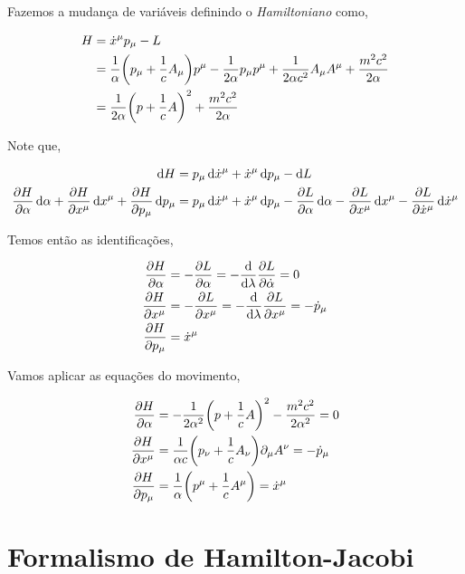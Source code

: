 \documentclass[twoside]{amsart}
\numberwithin{equation}{section}
\begin{document}
Fazemos a mudança de variáveis definindo o \emph{Hamiltoniano} como,

\begin{align}
    H&={\dot x}^\mu p_\mu-L\\
    &=\frac1\alpha\qty(p_\mu+\frac1c A_\mu)p^\mu-\frac{1}{2\alpha}p_\mu p^\mu+\frac{1}{2\alpha c^2}A_\mu A^\mu +\frac{m^2c^2}{2\alpha}\\
    &=\frac{1}{2\alpha}\qty(p+\frac1c A)^2+\frac{m^2c^2}{2\alpha}
\end{align}

Note que,

\begin{align}
    \dd{H}&=p_\mu \dd{\dot{x}^\mu}+\dot{x}^\mu\dd{p_\mu}-\dd{L}\\
    \pdv{H}{\alpha}\dd{\alpha}+\pdv{H}{x^\mu}\dd{x^\mu}+\pdv{H}{p_\mu}\dd{p_\mu}&=p_\mu \dd{\dot{x}^\mu}+\dot{x}^\mu\dd{p_\mu}-\pdv{L}{\alpha}\dd{\alpha}-\pdv{L}{x^\mu}\dd{x^\mu}-\pdv{L}{\dot{x}^\mu}\dd{\dot{x}^\mu}
\end{align}

Temos então as identificações,

\begin{align}
    \pdv{H}{\alpha}&=-\pdv{L}{\alpha}=-\dv{}{\lambda}\pdv{L}{\dot\alpha}=0\\
    \pdv{H}{x^\mu}&=-\pdv{L}{x^\mu}=-\dv{}{\lambda}\pdv{L}{x^\mu}=-\dot{p}_\mu\\
    \pdv{H}{p_\mu}&=\dot{x}^\mu
\end{align}

Vamos aplicar as equações do movimento,

\begin{align}
    \pdv{H}{\alpha}&=-\frac{1}{2\alpha^2}\qty(p+\frac1c A)^2-\frac{m^2c^2}{2\alpha^2}=0\\
    \pdv{H}{x^\mu}&=\frac{1}{\alpha c}\qty(p_\nu+\frac1c A_\nu)\partial_\mu A^\nu=-\dot{p}_\mu\\
    \pdv{H}{p_\mu}&=\frac{1}{\alpha}\qty(p^\mu+\frac1c A^\mu)=\dot{x}^\mu
\end{align}



\section{Formalismo de Hamilton-Jacobi}
\end{document}
